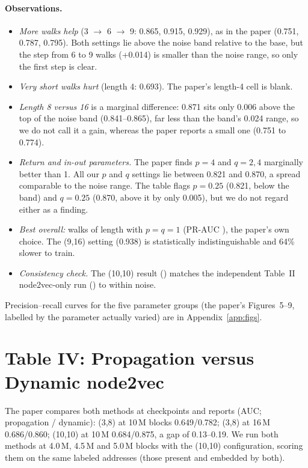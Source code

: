 \paragraph{Observations.}
\begin{itemize}
\item \emph{More walks help} (3 $\to$ 6 $\to$ 9: 0.865, 0.915, 0.929), as in the paper (0.751, 0.787, 0.795). Both settings lie above the noise band relative to the base, but the step from 6 to 9 walks (+0.014) is smaller than the noise range, so only the first step is clear.
\item \emph{Very short walks hurt} (length 4: 0.693). The paper's length-4 cell is blank.
\item \emph{Length 8 versus 16} is a marginal difference: 0.871 sits only 0.006 above the top of the noise band (0.841--0.865), far less than the band's 0.024 range, so we do not call it a gain, whereas the paper reports a small one (0.751 to 0.774).
\item \emph{Return and in-out parameters.} The paper finds $p=4$ and $q=2,4$ marginally better than 1. All our $p$ and $q$ settings lie between 0.821 and 0.870, a spread comparable to the noise range. The table flags $p=0.25$ (0.821, below the band) and $q=0.25$ (0.870, above it by only 0.005), but we do not regard either as a finding.
\item \emph{Best overall:} \BestWalks{} walks of length \BestLen{} with $p=q=1$ (PR-AUC \BestPRAUC), the paper's own choice. The (9,16) setting (0.938) is statistically indistinguishable and 64\% slower to train.
\item \emph{Consistency check.} The (10,10) result (\TenTenPRAUC) matches the independent Table~II node2vec-only run (\TableTwoNtvPRAUC) to within noise.
\end{itemize}
Precision--recall curves for the five parameter groups (the paper's Figures~5--9, labelled by the parameter actually varied) are in Appendix~\ref{app:figs}.

\section{Table IV: Propagation versus Dynamic node2vec}
The paper compares both methods at checkpoints and reports (AUC; propagation / dynamic): (3,8) at 10\,M blocks 0.649/0.782; (3,8) at 16\,M 0.686/0.860; (10,10) at 10\,M 0.684/0.875, a gap of 0.13--0.19. We run both methods at 4.0\,M, 4.5\,M and 5.0\,M blocks with the (10,10) configuration, scoring them on the same labeled addresses (those present and embedded by both).
\begin{table}[H]
\centering\scriptsize\singlespacing

\caption{Propagation versus dynamic node2vec, node2vec features only. ``Shared set'' = labeled addresses present at that block and embedded by both methods; PR-AUC and F$_1$ are scored there.}
\label{tab:t4}
\end{table}
